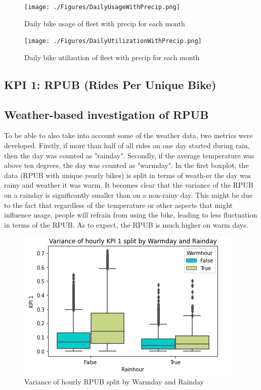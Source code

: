 \begin{figure}[H]
   \centering
    \texttt{[image: ./Figures/DailyUsageWithPrecip.png]}
    \caption{Daily bike usage of fleet with precip for each month}
    \label{DailyUsageWithPrecip}
\end{figure}

\begin{figure}[H]
   \centering
    \texttt{[image: ./Figures/DailyUtilizationWithPrecip.png]}
    \caption{Daily bike utilization of fleet with precip for each month}
    \label{DailyUtilizationWithPrecip}
\end{figure}

\subsection{KPI 1: RPUB (Rides Per Unique Bike)}
\label{app:A3}

\subsection*{Weather-based investigation of RPUB}
\label{app:A1}

To be able to also take into account some of the weather data, two metrics were developed. Firstly, if more than half of all rides on one day started during rain, then the day was counted as "rainday". Secondly, if the average temperature was above ten degrees, the day was counted as "warmday".
In the first boxplot, the data (RPUB with unique yearly bikes) is split in terms of weath-er the day was rainy and weather it was warm. It becomes clear that the variance of the RPUB on a rainday is significantly smaller than on a non-rainy day. This might be due to the fact that regardless of the temperature or other aspects that might influence usage, people will refrain from using the bike, leading to less fluctuation in terms of the RPUB. As to expect, the RPUB is much higher on warm days. 

\begin{figure}[H]
   \centering
    \includegraphics[width=0.8\linewidth]{./Figures/APP1.png}
    \caption{Variance of hourly RPUB split by Warmday and Rainday}
    \label{APP1}
\end{figure}

